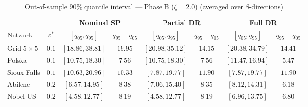 \begin{table}[htbp]
\centering
\caption{Out-of-sample 90\% quantile interval — Phase B ($\zeta=2.0$) (averaged over $\beta$-directions)}
\label{tab:oos-zeta20}
\small
\setlength{\tabcolsep}{6pt}
\begin{tabular}{l c cc cc cc}
\toprule
& & \multicolumn{2}{c}{\textbf{Nominal SP}} & \multicolumn{2}{c}{\textbf{Partial DR}} & \multicolumn{2}{c}{\textbf{Full DR}} \\
\cmidrule(lr){3-4} \cmidrule(lr){5-6} \cmidrule(lr){7-8}
Network & $\varepsilon^{*}$ & $[q_{05}, q_{95}]$ & $q_{95} \!-\! q_{05}$ & $[q_{05}, q_{95}]$ & $q_{95} \!-\! q_{05}$ & $[q_{05}, q_{95}]$ & $q_{95} \!-\! q_{05}$ \\
\midrule
Grid $5 \times 5$ & $0.1$ & $[18.86, 38.81]$ & $19.95$ & $[20.98, 35.12]$ & $\mathbf{14.15}$ & $[20.38, \mathbf{34.79}]$ & $14.41$ \\
Polska & $0.1$ & $[10.75, 18.30]$ & $7.56$ & $[10.75, 18.30]$ & $7.56$ & $[11.47, \mathbf{16.94}]$ & $\mathbf{5.47}$ \\
Sioux Falls & $0.1$ & $[10.63, 20.96]$ & $\mathbf{10.33}$ & $[7.87, \mathbf{19.77}]$ & $11.90$ & $[7.87, \mathbf{19.77}]$ & $11.90$ \\
Abilene & $0.2$ & $[6.57, 14.95]$ & $8.38$ & $[7.06, 15.40]$ & $8.35$ & $[8.12, \mathbf{14.31}]$ & $\mathbf{6.18}$ \\
Nobel-US & $0.2$ & $[4.58, \mathbf{12.77}]$ & $8.19$ & $[4.58, \mathbf{12.77}]$ & $8.19$ & $[6.96, 13.75]$ & $\mathbf{6.80}$ \\
\bottomrule
\end{tabular}
\end{table}


